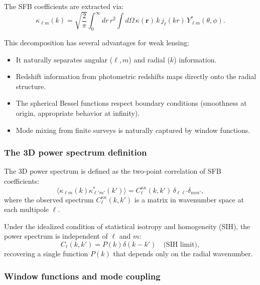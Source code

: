 The SFB coefficients are extracted via:
\begin{equation}
\kappa_{\ell m}(k) = \sqrt{\frac{2}{\pi}} \int_0^\infty dr \, r^2
\int d\Omega \, \kappa(\mathbf{r}) \, k \, j_\ell(kr) \, Y^*_{\ell m}(\theta, \phi).
\label{eq:sfb_inverse_convergence}
\end{equation}

This decomposition has several advantages for weak lensing:
\begin{itemize}
\item It naturally separates angular ($\ell, m$) and radial ($k$) information.
\item Redshift information from photometric redshifts maps directly onto the radial structure.
\item The spherical Bessel functions respect boundary conditions (smoothness at origin, appropriate behavior at infinity).
\item Mode mixing from finite surveys is naturally captured by window functions.
\end{itemize}

\subsubsection{The 3D power spectrum definition}

The 3D power spectrum is defined as the two-point correlation of SFB coefficients:
\begin{equation}
\bigl\langle \kappa_{\ell m}(k) \kappa^*_{\ell' m'}(k') \bigr\rangle = C^{\kappa\kappa}_\ell(k, k') \, \delta_{\ell\ell'} \delta_{mm'},
\label{eq:3d_power_spectrum_kappa}
\end{equation}
where the observed spectrum $C^{\kappa\kappa}_\ell(k,k')$ is a matrix in wavenumber space at each multipole $\ell$.

Under the idealized condition of statistical isotropy and homogeneity (SIH), the power spectrum is independent of $\ell$ and $m$:
\begin{equation}
C_\ell(k,k') = P(k) \delta(k-k') \quad \text{(SIH limit)},
\label{eq:power_sfb_isotropic_limit}
\end{equation}
recovering a single function $P(k)$ that depends only on the radial wavenumber.

\subsubsection{Window functions and mode coupling}


